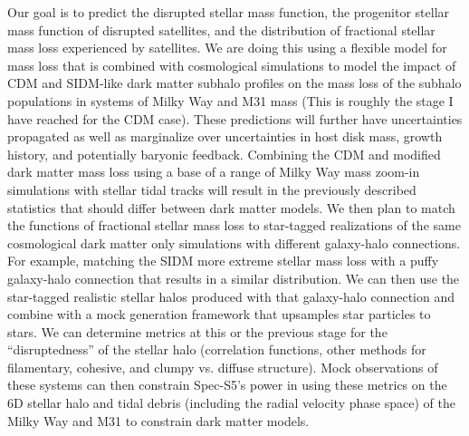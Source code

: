 Our goal is to predict the disrupted stellar mass function, the progenitor stellar mass function of disrupted satellites, and the distribution of fractional stellar mass loss experienced by satellites. We are doing this using a flexible model for mass loss that is combined with cosmological simulations to model the impact of CDM and SIDM-like dark matter subhalo profiles on the mass loss of the subhalo populations in systems of Milky Way and M31 mass (This is roughly the stage I have reached for the CDM case). These predictions will further have uncertainties propagated as well as marginalize over uncertainties in host disk mass, growth history, and potentially baryonic feedback. Combining the CDM and modified dark matter mass loss using a base of a range of Milky Way mass zoom-in simulations with stellar tidal tracks will result in the previously described statistics that should differ between dark matter models. We then plan to match the functions of fractional stellar mass loss to star-tagged realizations of the same cosmological dark matter only simulations with different galaxy-halo connections. For example, matching the SIDM more extreme stellar mass loss with a puffy galaxy-halo connection that results in a similar distribution. We can then use the star-tagged realistic stellar halos produced with that galaxy-halo connection and combine with a mock generation framework that upsamples star particles to stars. We can determine metrics at this or the previous stage for the “disruptedness” of the stellar halo (correlation functions, other methods for filamentary, cohesive, and clumpy vs. diffuse structure). Mock observations of these systems can then constrain Spec-S5’s power in using these metrics on the 6D stellar halo and tidal debris (including the radial velocity phase space) of the Milky Way and M31 to constrain dark matter models.
